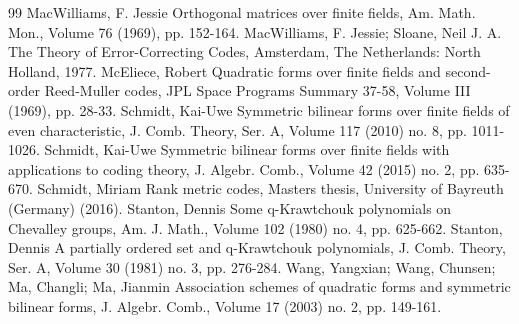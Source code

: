 \begin{thebibliography}{99}
 MacWilliams, F. Jessie Orthogonal matrices over finite fields, Am. Math. Mon., Volume 76 (1969), pp. 152-164.
 MacWilliams, F. Jessie; Sloane, Neil J. A. The Theory of Error-Correcting Codes, Amsterdam, The Netherlands: North Holland, 1977.
 McEliece, Robert Quadratic forms over finite fields and second-order Reed-Muller codes, JPL Space Programs Summary 37-58, Volume III (1969), pp. 28-33.
 Schmidt, Kai-Uwe Symmetric bilinear forms over finite fields of even characteristic, J. Comb. Theory, Ser. A, Volume 117 (2010) no. 8, pp. 1011-1026.
 Schmidt, Kai-Uwe Symmetric bilinear forms over finite fields with applications to coding theory, J. Algebr. Comb., Volume 42 (2015) no. 2, pp. 635-670.
 Schmidt, Miriam Rank metric codes, Masters thesis, University of Bayreuth (Germany) (2016).
 Stanton, Dennis Some q-Krawtchouk polynomials on Chevalley groups, Am. J. Math., Volume 102 (1980) no. 4, pp. 625-662.
 Stanton, Dennis A partially ordered set and q-Krawtchouk polynomials, J. Comb. Theory, Ser. A, Volume 30 (1981) no. 3, pp. 276-284.
 Wang, Yangxian; Wang, Chunsen; Ma, Changli; Ma, Jianmin Association schemes of quadratic forms and symmetric bilinear forms, J. Algebr. Comb., Volume 17 (2003) no. 2, pp. 149-161.
\end{thebibliography}
